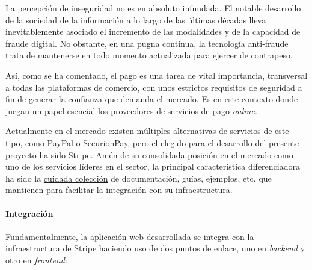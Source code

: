 \documentclass[a4paper,12pt,twoside,openright]{report}
\begin{document}
    La percepción de inseguridad no es en absoluto infundada. El notable desarrollo de la sociedad de la información a lo largo de las últimas décadas lleva inevitablemente asociado el incremento de las modalidades y de la capacidad de fraude digital. No obstante, en una pugna continua, la tecnología anti-fraude trata de mantenerse en todo momento actualizada para ejercer de contrapeso.
    
    Así, como se ha comentado, el pago es una tarea de vital importancia, transversal a todas las plataformas de comercio, con unos estrictos requisitos de seguridad a fin de generar la confianza que demanda el mercado. Es en este contexto donde juegan un papel esencial los proveedores de servicios de pago \emph{online}.
    
    Actualmente en el mercado existen múltiples alternativas de servicios de este tipo, como \href{https://www.paypal.com/}{PayPal} o \href{https://securionpay.com/}{SecurionPay}, pero el elegido para el desarrollo del presente proyecto ha sido \href{https://stripe.com/}{Stripe}. Amén de su consolidada posición en el mercado como uno de los servicios líderes en el sector, la principal característica diferenciadora ha sido la \href{https://stripe.com/docs}{cuidada colección} de documentación, guías, ejemplos, etc. que mantienen para facilitar la integración con su infraestructura. 
    
    \paragraph{Integración}
    Fundamentalmente, la aplicación web desarrollada se integra con la infraestructura de Stripe haciendo uso de dos puntos de enlace, uno en \emph{backend} y otro en \emph{frontend}:
    
\end{document}

